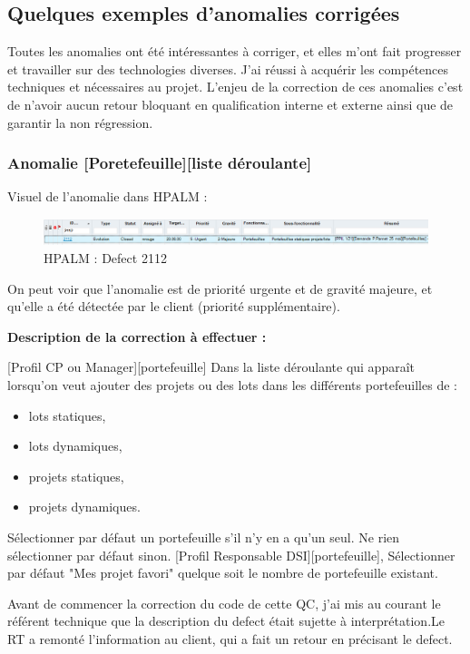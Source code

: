 \subsection{Quelques exemples d'anomalies corrigées}

Toutes les anomalies ont été intéressantes à corriger, et elles m'ont fait progresser et travailler sur des technologies diverses. J'ai réussi à acquérir les compétences techniques et nécessaires au projet. L'enjeu de la correction de ces anomalies c'est de n'avoir aucun retour bloquant en qualification interne et externe ainsi que de garantir la non régression.

\subsubsection{Anomalie [Poretefeuille][liste déroulante]}

Visuel de l'anomalie dans HPALM :
\begin{figure}[!h]
\centering
\includegraphics[width=1\textwidth]{images/QC2120.PNG}
\caption{HPALM : Defect 2112}
\end{figure}

On peut voir que l'anomalie est de priorité urgente et de gravité majeure, et qu'elle a été détectée par le client (priorité supplémentaire).

\textbf{Description de la correction à effectuer :} 

[Profil CP ou Manager][portefeuille]
Dans la liste déroulante qui apparaît lorsqu'on veut ajouter des projets ou des lots dans les différents portefeuilles de : 

\begin{itemize}
    \item lots statiques,
    \item lots dynamiques,
    \item projets statiques,
    \item projets dynamiques.
\end{itemize}

Sélectionner par défaut un portefeuille s'il n'y en a qu'un seul. Ne rien sélectionner par défaut sinon. 
[Profil Responsable DSI][portefeuille], Sélectionner par défaut "Mes projet favori" quelque soit le nombre de portefeuille existant.

Avant de commencer la correction du code de cette QC, j'ai mis au courant le référent technique que la description du defect était sujette à interprétation.Le RT a remonté l'information au client, qui a fait un retour en précisant le defect.

